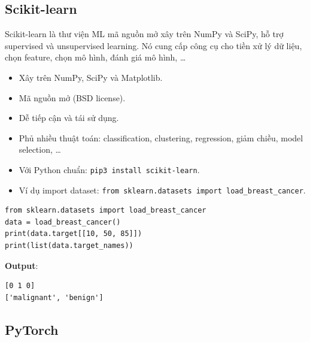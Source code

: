 \subsection{Scikit-learn}

\begin{dinhnghia}[title={Scikit-learn}]
Scikit-learn là thư viện ML mã nguồn mở xây trên NumPy và SciPy, hỗ trợ supervised và unsupervised learning.
Nó cung cấp công cụ cho tiền xử lý dữ liệu, chọn feature, chọn mô hình, đánh giá mô hình, \ldots
\end{dinhnghia}

\begin{phuongphap}[title={feature nổi bật}]
\begin{itemize}
  \item Xây trên NumPy, SciPy và Matplotlib.
  \item Mã nguồn mở (BSD license).
  \item Dễ tiếp cận và tái sử dụng.
  \item Phủ nhiều thuật toán: classification, clustering, regression, giảm chiều, model selection, \ldots
\end{itemize}
\end{phuongphap}

\begin{phuongphap}[title={Cài đặt/nhập}]
\begin{itemize}
  \item Với Python chuẩn: \texttt{pip3 install scikit-learn}.
  \item Ví dụ import dataset: \texttt{from sklearn.datasets import load\_breast\_cancer}.
\end{itemize}
\end{phuongphap}

\begin{vidu}[title={Ví dụ: load Breast Cancer dataset}]
\begin{lstlisting}
from sklearn.datasets import load_breast_cancer
data = load_breast_cancer()
print(data.target[[10, 50, 85]])
print(list(data.target_names))
\end{lstlisting}

\textbf{Output}:
\begin{lstlisting}
[0 1 0]
['malignant', 'benign']
\end{lstlisting}
\end{vidu}

\subsection{PyTorch}

